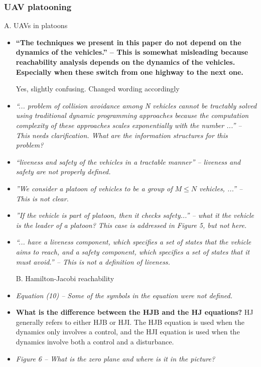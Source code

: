 \documentclass[submit]{aiaa-pretty}
\begin{document}
\subsubsection{UAV platooning}
A. UAVs in platoons
\begin{itemize}
\item \textbf{``The techniques we present in this paper do not depend on the dynamics of the vehicles.'' – This is somewhat misleading because reachability analysis depends on the dynamics of the vehicles. Especially when these switch from one highway to the next one.}

Yes, slightly confusing. Changed wording accordingly

\item \textit{``... problem of collision avoidance among N vehicles cannot be tractably solved using traditional dynamic programming approaches because the computation complexity of these approaches scales exponentially with the number ...'' – This needs clarification. What are the information structures for this problem?}

\item \textit{``liveness and safety of the vehicles in a tractable manner'' – liveness and safety are not properly defined.}
\item \textit{''We consider a platoon of vehicles to be a group of $M \le N$ vehicles, ...'' – This is not clear.}
\item \textit{''If the vehicle is part of platoon, then it checks safety...” – what it the vehicle is the leader of a platoon? This case is addressed in Figure 5, but not here.}
\item \textit{``... have a liveness component, which specifies a set of states that the vehicle aims to reach, and a safety component, which specifies a set of states that it must avoid.'' – This is not a definition of liveness.}

B. Hamilton-Jacobi reachability
\item \textit{Equation (10) – Some of the symbols in the equation were not defined.}
\item \textbf{What is the difference between the HJB and the HJ equations?}
HJ generally refers to either HJB or HJI. The HJB equation is used when the dynamics only involves a control, and the HJI equation is used when the dynamics involve both a control and a disturbance.
\item \textit{Figure 6 – What is the zero plane and where is it in the picture?}
\end{itemize}
\end{document}
